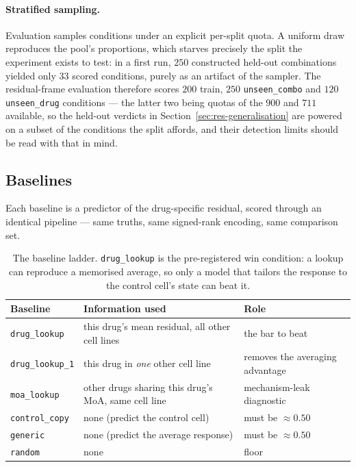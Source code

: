 \paragraph{Stratified sampling.} Evaluation samples conditions under an explicit per-split quota. A
uniform draw reproduces the pool's proportions, which starves precisely the split the experiment
exists to test: in a first run, $250$ constructed held-out combinations yielded only $33$ scored
conditions, purely as an artifact of the sampler. The residual-frame evaluation therefore scores
$200$ train, $250$ \texttt{unseen\_combo} and $120$ \texttt{unseen\_drug} conditions --- the latter
two being quotas of the $900$ and $711$ available, so the held-out verdicts in
Section~\ref{sec:res-generalisation} are powered on a subset of the conditions the split affords,
and their detection limits should be read with that in mind.

\subsection{Baselines}
\label{sec:methods-baselines}

Each baseline is a predictor of the drug-specific residual, scored through an identical pipeline ---
same truths, same signed-rank encoding, same comparison set.

\begin{table}[h]
\centering
\begin{tabular}{lll}
\toprule
Baseline & Information used & Role \\
\midrule
\texttt{drug\_lookup}   & this drug's mean residual, all other cell lines & the bar to beat \\
\texttt{drug\_lookup\_1} & this drug in \emph{one} other cell line & removes the averaging advantage \\
\texttt{moa\_lookup}    & other drugs sharing this drug's MoA, same cell line & mechanism-leak diagnostic \\
\texttt{control\_copy}  & none (predict the control cell) & must be $\approx 0.50$ \\
\texttt{generic}        & none (predict the average response) & must be $\approx 0.50$ \\
\texttt{random}         & none & floor \\
\bottomrule
\end{tabular}
\caption{The baseline ladder. \texttt{drug\_lookup} is the pre-registered win condition: a lookup
can reproduce a memorised average, so only a model that tailors the response to the control cell's
state can beat it.}
\label{tab:baselines}
\end{table}

